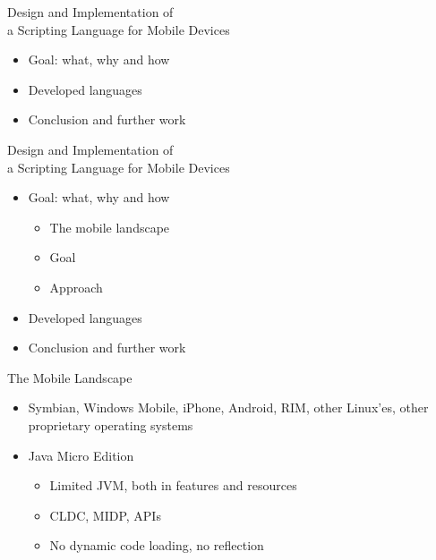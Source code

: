 \documentclass[a4paper,landscape]{slides}
\begin{document}
\begin{slide}
        {\large Design and Implementation of \\ a Scripting Language for Mobile Devices \\ \mbox{}}
\begin{itemize}
\item Goal:  what, why and how 
\item Developed languages 
\item Conclusion and further work 
\end{itemize}
\end{slide}

\begin{slide}
        {\large Design and Implementation of \\ a Scripting Language for Mobile Devices \\ \mbox{}}
\begin{itemize}\addtolength{\itemsep}{-\baselineskip}
\item Goal:  what, why and how 
        \begin{itemize}
            \item The mobile landscape 
            \item Goal
            \item Approach
        \end{itemize}
\item Developed languages 
\item Conclusion and further work 
\end{itemize}
\end{slide}

\begin{slide}
	{\large 
            The Mobile Landscape
	\\ \mbox{}}
	\begin{itemize}
            \item Symbian, Windows Mobile, iPhone, Android, RIM, other Linux'es, other proprietary operating systems
            \item  Java Micro Edition
	        \begin{itemize}
                    \item Limited JVM, both in features and resources
                    \item CLDC, MIDP, APIs
                    \item No dynamic code loading, no reflection
	        \end{itemize}
	\end{itemize}
\end{slide}
\end{document}
